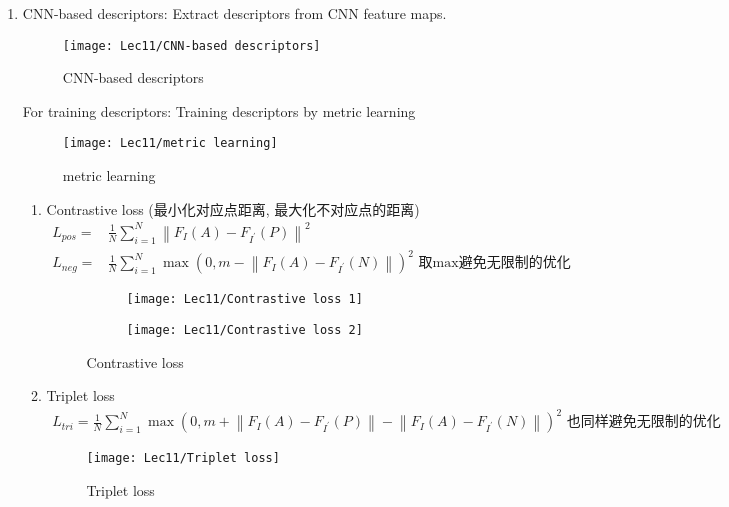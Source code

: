 \begin{enumerate}
    \item CNN-based descriptors: Extract descriptors from CNN feature maps. 
    
    \begin{figure}[H]
        \centering
        \texttt{[image: Lec11/CNN-based descriptors]}
        \caption{CNN-based descriptors}
    \end{figure}

    For training descriptors:
    Training descriptors by metric learning
    \begin{figure}[H]
        \centering
        \texttt{[image: Lec11/metric learning]}
        \caption{metric learning}
    \end{figure}

    \begin{enumerate}
        \item Contrastive loss (最小化对应点距离, 最大化不对应点的距离)
        \begin{align*}
            L_{pos}=& \frac{1}{N} \sum_{i=1}^N \left\| F_I(A)-F_{I^{\prime}}(P) \right\|^2\\
            L_{neg}=&\frac{1}{N}\sum_{i=1}^N \max(0,m-\left\| F_I(A)-F_{I^{\prime}}(N) \right\|)^2 \text{ 取max避免无限制的优化}
        \end{align*}
        \begin{figure}[H]
            \centering
            \begin{subfigure}{0.28\textwidth}
                \centering
                \texttt{[image: Lec11/Contrastive loss 1]}
            \end{subfigure}
            \begin{subfigure}{0.28\textwidth}
                \centering
                \texttt{[image: Lec11/Contrastive loss 2]}
            \end{subfigure}
            \caption{Contrastive loss}
        \end{figure}
        
        \item Triplet loss 
        \begin{align*}
            L_{tri}=\frac{1}{N}\sum_{i=1}^N \max(0,m+ \left\| F_I(A)-F_{I^{\prime}}(P) \right\|-\left\| F_I(A)-F_{I^{\prime}}(N) \right\|)^2 \text{ 也同样避免无限制的优化}
        \end{align*}
        \begin{figure}[H]
            \centering
            \texttt{[image: Lec11/Triplet loss]}
            \caption{Triplet loss}
        \end{figure}
    \end{enumerate}
    

\end{enumerate}
